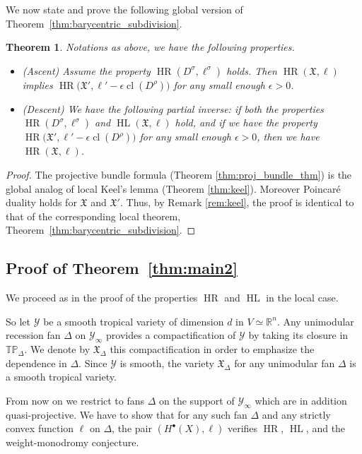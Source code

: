 \documentclass[11pt]{amsart}
\newtheorem{thm}{Theorem}[section]
\theoremstyle{definition}
\numberwithin{equation}{section}
\renewcommand{\~}{\widetilde}
\newcommand{\R}{\mathbb{R}}
\newcommand{\bul}{\bullet} %
\DeclareMathOperator{\HR}{HR} %
\DeclareMathOperator{\HL}{HL} %
\DeclareMathOperator{\class}{cl} %
\newcommand{\TP}{\mathbb{TP}} %
\newcommand{\X}{\mathfrak X}
\newcommand{\Y}{\mathscr Y}
\begin{document}
We now state and prove the following global version of Theorem~\ref{thm:barycentric_subdivision}.

\begin{thm} \label{thm:global_ascent_descent} Notations as above, we have the following properties.
\begin{itemize}
\item \emph{(Ascent)} Assume the property $\HR(D^\sigma,\ell^\sigma)$ holds. Then $\HR(\X, \ell)$ implies $\HR\bigl(\X',\ell'-\epsilon\class(D^\rho)\bigr)$ for any small enough $\epsilon>0$.

\item \emph{(Descent)} We have the following partial inverse: if both the properties $\HR(D^\sigma,\ell^\sigma)$ and $\HL(\X,\ell)$ hold, and if we have the property $\HR\bigl(\X',\ell'-\epsilon\class(D^\rho)\bigr)$ for any small enough $\epsilon>0$, then we have $\HR(\X, \ell)$.
\end{itemize}
\end{thm}

\begin{proof}
The projective bundle formula (Theorem \ref{thm:proj_bundle_thm}) is the global analog of local Keel's lemma (Theorem \ref{thm:keel}). Moreover Poincaré duality holds for $\X$ and $\X'$. Thus, by Remark \ref{rem:keel}, the proof is identical to that of the corresponding local theorem, Theorem~\ref{thm:barycentric_subdivision}.
\end{proof}



\subsection{Proof of Theorem~\ref{thm:main2}} We proceed as in the proof of the properties $\HR$ and $\HL$ in the local case.

So let $\Y$ be a smooth tropical variety of dimension $d$ in $V \simeq \R^n$. Any unimodular recession fan $\Delta$ on $\Y_\infty$ provides a compactification of $\Y$ by taking its closure in $\TP_\Delta$. We denote by $\X_\Delta$ this compactification in order to emphasize the dependence in $\Delta$. Since $\Y$ is smooth, the variety $\X_\Delta$ for any unimodular fan $\Delta$ is a smooth tropical variety.

\medskip

From now on we restrict to fans $\Delta$ on the support of $\Y_\infty$ which are in addition quasi-projective.
We have to show that for any such fan $\Delta$ and any strictly convex function $\ell$ on $\Delta$, the pair $(H^\bul(X), \ell)$ verifies $\HR$, $\HL$, and the weight-monodromy conjecture.
\end{document}
